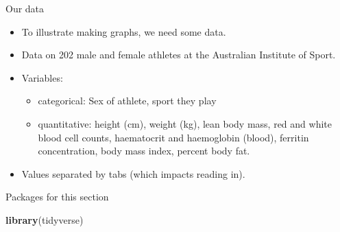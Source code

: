 \documentclass[ignorenonframetext,]{beamer}
\newenvironment{Shaded}{\begin{snugshade}}{\end{snugshade}}
\newcommand{\KeywordTok}[1]{\textcolor[rgb]{0.13,0.29,0.53}{\textbf{#1}}}
\newcommand{\NormalTok}[1]{#1}
\providecommand{\tightlist}{%
  \setlength{\itemsep}{0pt}\setlength{\parskip}{0pt}}
\begin{document}
\begin{frame}{Our data}
\protect\hypertarget{our-data}{}

\begin{itemize}
\tightlist
\item
  To illustrate making graphs, we need some data.
\item
  Data on 202 male and female athletes at the Australian Institute of
  Sport.
\item
  Variables:

  \begin{itemize}
  \tightlist
  \item
    categorical: Sex of athlete, sport they play
  \item
    quantitative: height (cm), weight (kg), lean body mass, red and
    white blood cell counts, haematocrit and haemoglobin (blood),
    ferritin concentration, body mass index, percent body fat.
  \end{itemize}
\item
  Values separated by tabs (which impacts reading in).
\end{itemize}

\end{frame}

\begin{frame}[fragile]{Packages for this section}
\protect\hypertarget{packages-for-this-section-1}{}

\begin{Shaded}
\begin{Highlighting}[]
\KeywordTok{library}\NormalTok{(tidyverse)}
\end{Highlighting}
\end{Shaded}

\end{frame}
\end{document}
